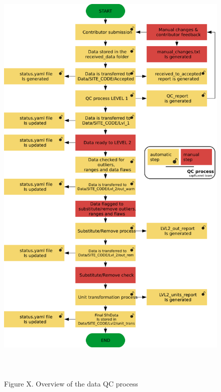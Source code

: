 \documentclass[]{article}
\begin{document}
\begin{figure}

{\centering \includegraphics[height=800px]{resources/QC_summary2} 

}

\caption{Figure X. Overview of the data QC process}\label{fig:fig_QC}
\end{figure}

\pagebreak

\pagebreak
\end{document}
